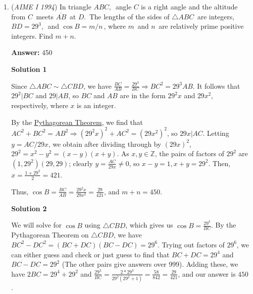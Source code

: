 \begin{enumerate}
 We also know that $a_0=a_1=a_2=1$ (i.e., you are guaranteed to win with two tiles remaining), so we are able to find an end to the recursion.

 Now we are left with four rules:

 1) $a_{m,0}=a_{m,1}$

 2) $a_{m,1}=\frac{1}{2m-1}a_{m-1,0}+\frac{2m-2}{2m-1}a_{m,2}$

 3) $a_{m,2}=\frac{1}{m-1}a_{m-1,1}$

 4) $a_0=a_1=a_2=1$

 We then calculate the terms of the multi-variable recursion and arrive at $a_{6,0}=\frac{9}{385}$, so the answer is $385+9=\boxed{394}$.

 


	\item (\textit{AIME I 1994}) In triangle $ABC,\,$ angle $C$ is a right angle and the altitude from $C\,$ meets $\overline{AB}\,$ at $D.\,$  The lengths of the sides of $\triangle ABC\,$ are integers, $BD=29^3,\,$ and $\cos B=m/n\,$, where $m\,$ and $n\,$ are relatively prime positive integers.  Find $m+n.\,$

 \textbf{Answer: }450



\textbf{Solution 1}

Since $\triangle ABC \sim \triangle CBD$, we have $\frac{BC}{AB} = \frac{29^3}{BC} \Longrightarrow BC^2 = 29^3 AB$. It follows that $29^2 | BC$ and $29 | AB$, so $BC$ and $AB$ are in the form $29^2 x$ and $29 x^2$, respectively, where $x$ is an integer. 

 By the \href{https://artofproblemsolving.com/wiki/index.php?title=Pythagorean\_Theorem}{Pythagorean Theorem}, we find that $AC^2 + BC^2 = AB^2 \Longrightarrow (29^2x)^2 + AC^2 = (29 x^2)^2$, so $29x | AC$. Letting $y = AC / 29x$, we obtain after dividing through by $(29x)^2$, $29^2 = x^2 - y^2 = (x-y)(x+y)$. As $x,y \in \mathbb{Z}$, the pairs of factors of $29^2$ are $(1,29^2)(29,29)$; clearly $y = \frac{AC}{29x} \neq 0$, so $x-y = 1, x+y= 29^2$. Then, $x = \frac{1+29^2}{2} = 421$.

 Thus, $\cos B = \frac{BC}{AB} = \frac{29^2 x}{29x^2} = \frac{29}{421}$, and $m+n = \boxed{450}$.

 



\textbf{Solution 2}

We will solve for $\cos B$ using $\triangle CBD$, which gives us $\cos B = \frac{29^3}{BC}$. By the Pythagorean Theorem on $\triangle CBD$, we have $BC^2 - DC^2 = (BC + DC)(BC - DC) = 29^6$. Trying out factors of $29^6$, we can either guess and check or just guess to find that $BC + DC = 29^4$ and $BC - DC = 29^2$ (The other pairs give answers over 999). Adding these, we have $2BC = 29^4 + 29^2$ and $\frac{29^3}{BC} = \frac{2*29^3}{29^2 (29^2 +1)} = \frac{58}{842} = \frac{29}{421}$, and our answer is $\boxed{450}$.


\end{enumerate}
